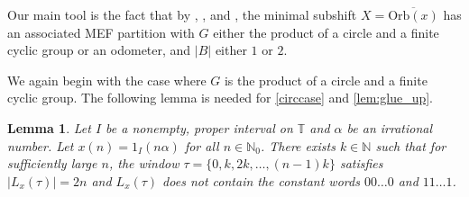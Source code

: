 \documentclass[11pt,reqno]{amsart}
\newtheorem{lemma}[theorem]{Lemma}
\theoremstyle{definition}
\newtheorem{definition}[theorem]{Definition}
\theoremstyle{plain}
\newcommand{\OO}{\mathrm{Orb}}
\newcommand{\Z}{\mathbb{Z}}
\newcommand{\N}{\mathbb{N}}
\newcommand{\T}{\mathbb{T}}
\newcommand{\AuthornoteA}[2]{{\sf\small\color{magenta}{[#1: #2]}}}
\newcommand{\Anote}{\AuthornoteA{A}}
\begin{document}
Our main tool is the fact that by , , and , the minimal subshift $X = \overline{\OO(x)}$ has an associated MEF partition with $G$ either the product of a circle and a finite cyclic group or an odometer, and $|B|$ either $1$ or $2$. 

We again begin with the case where $G$ is the product of a circle and a finite cyclic group. The following lemma is needed for \cref{circcase} and \cref{lem:glue_up}.
\begin{lemma}\label{lem:sturmian_no_constant_words}
Let $I$ be a nonempty, proper interval on $\T$ and $\alpha$ be an irrational number. Let $x(n) = 1_I(n \alpha)$ for all $n \in \N_0$.
There exists $k \in \N$ such that for sufficiently large $n$, the window $\tau = \{0, k, 2k, \ldots, (n-1)k\}$ satisfies $|L_{x}(\tau)| = 2n$ and $L_x(\tau)$ does not contain the constant words $00\ldots 0$ and $11 \ldots 1$.

\end{lemma}
\end{document}

